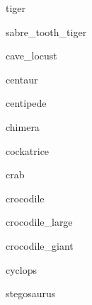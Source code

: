 \documentclass[letterpaper,serif]{module}
\begin{document}
\begin{newmonster}{tiger}\end{newmonster}

\begin{newmonster}{sabre_tooth_tiger}\end{newmonster}

\begin{newmonster}{cave_locust}\end{newmonster}

\begin{newmonster}{centaur}\end{newmonster}

\begin{newmonster}{centipede}\end{newmonster}

\begin{newmonster}{chimera}\end{newmonster}

\begin{newmonster}{cockatrice}\end{newmonster}

\begin{newmonster}{crab}\end{newmonster}


\begin{newmonster}{crocodile}\end{newmonster}

\begin{newmonster}{crocodile_large}\end{newmonster}

\begin{newmonster}{crocodile_giant}\end{newmonster}

\begin{newmonster}{cyclops}\end{newmonster}


\begin{newmonster}{stegosaurus}\end{newmonster}
\end{document}
